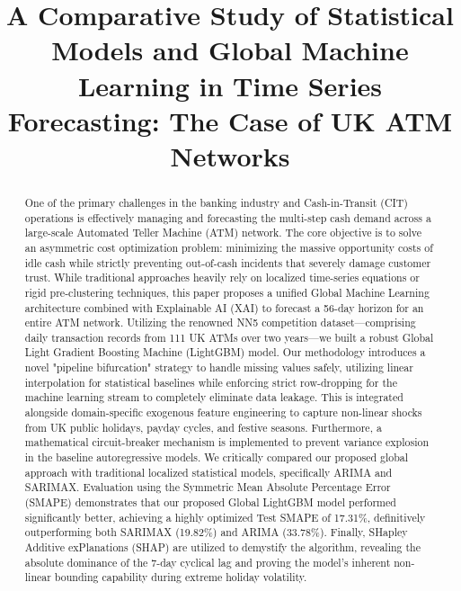 \documentclass[conference, 12pt, onecolumn]{IEEEtran}
\begin{document}
\title{A Comparative Study of Statistical Models and Global Machine Learning in Time Series Forecasting: The Case of UK ATM Networks}

\author{
}

\maketitle

\begin{abstract}
\normalsize\raggedright
One of the primary challenges in the banking industry and Cash-in-Transit (CIT) operations is effectively managing and forecasting the multi-step cash demand across a large-scale Automated Teller Machine (ATM) network. The core objective is to solve an asymmetric cost optimization problem: minimizing the massive opportunity costs of idle cash while strictly preventing out-of-cash incidents that severely damage customer trust. While traditional approaches heavily rely on localized time-series equations or rigid pre-clustering techniques, this paper proposes a unified Global Machine Learning architecture combined with Explainable AI (XAI) to forecast a 56-day horizon for an entire ATM network. Utilizing the renowned NN5 competition dataset—comprising daily transaction records from 111 UK ATMs over two years—we built a robust Global Light Gradient Boosting Machine (LightGBM) model. Our methodology introduces a novel "pipeline bifurcation" strategy to handle missing values safely, utilizing linear interpolation for statistical baselines while enforcing strict row-dropping for the machine learning stream to completely eliminate data leakage. This is integrated alongside domain-specific exogenous feature engineering to capture non-linear shocks from UK public holidays, payday cycles, and festive seasons. Furthermore, a mathematical circuit-breaker mechanism is implemented to prevent variance explosion in the baseline autoregressive models. We critically compared our proposed global approach with traditional localized statistical models, specifically ARIMA and SARIMAX. Evaluation using the Symmetric Mean Absolute Percentage Error (SMAPE) demonstrates that our proposed Global LightGBM model performed significantly better, achieving a highly optimized Test SMAPE of 17.31\%, definitively outperforming both SARIMAX (19.82\%) and ARIMA (33.78\%). Finally, SHapley Additive exPlanations (SHAP) are utilized to demystify the algorithm, revealing the absolute dominance of the 7-day cyclical lag and proving the model's inherent non-linear bounding capability during extreme holiday volatility.
\end{abstract}
\end{document}
